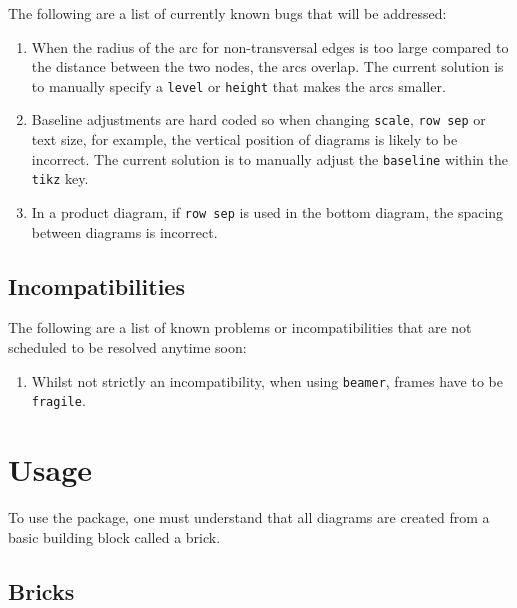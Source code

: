 \documentclass{ltxdoc}
\begin{document}
The following are a list of currently known bugs that will be addressed:
\begin{enumerate}
    \item When the radius of the arc for non-transversal edges is too large compared to the distance between the two nodes, the arcs overlap. The current solution is to manually specify a \texttt{level} or \texttt{height} that makes the arcs smaller.
    \item Baseline adjustments are hard coded so when changing \texttt{scale}, \texttt{row sep} or text size, for example, the vertical position of diagrams is likely to be incorrect. The current solution is to manually adjust the \texttt{baseline} within the \texttt{tikz} key.
    \item In a product diagram, if \texttt{row sep} is used in the bottom diagram, the spacing between diagrams is incorrect.
\end{enumerate}

\subsection{Incompatibilities}

The following are a list of known problems or incompatibilities that are not scheduled to be resolved anytime soon:
\begin{enumerate}
    \item Whilst not strictly an incompatibility, when using \texttt{beamer}, frames have to be \texttt{fragile}.
\end{enumerate}

\section{Usage}

To use the package, one must understand that all diagrams are created from a basic building block called a brick.

\subsection{Bricks}
\end{document}
